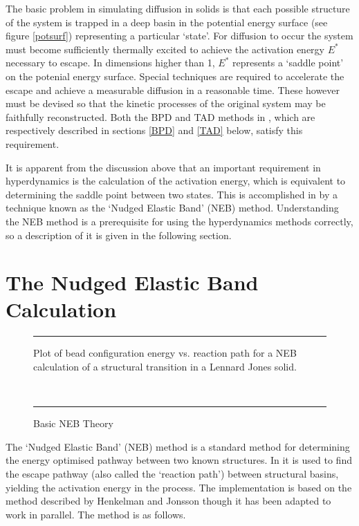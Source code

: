 The basic problem in simulating diffusion in solids is that each
possible structure of the system is trapped in a deep basin in
the potential energy surface (see figure \ref{potsurf}) representing a
particular `state'. For diffusion to occur the system must become
sufficiently thermally excited to achieve the activation energy
$E^{*}$ necessary to escape.  In dimensions higher than 1, $E^{*}$
represents a `saddle point' on the potenial energy surface.  Special
techniques are required to accelerate the escape and achieve a
measurable diffusion in a reasonable time. These however must be
devised so that the kinetic processes of the original system may be
faithfully reconstructed. Both the BPD and TAD methods in \D{}, which
are respectively described in sections \ref{BPD} and \ref{TAD} below,
satisfy this requirement.

It is apparent from the discussion above that an important requirement
in hyperdynamics is the calculation of the activation energy, which is
equivalent to determining the saddle point between two states. This is
accomplished in \D{} by a technique known as the `Nudged Elastic Band'
(NEB) method. Understanding the NEB method is a prerequisite for using
the \D{} hyperdynamics methods correctly, so a description of it is
given in the following section.

\section{The Nudged Elastic Band Calculation}

\label{NEB}
\begin{figure}[ht]
\hrule
\vspace{1.0cm}
\begin{center}
\centerline{}
\end{center}
\caption{Basic NEB Theory\label{nebfig}}
Plot of bead configuration energy vs. reaction path for a NEB
calculation of a structural transition in a Lennard Jones solid.

~
\hrule
\end{figure}
The `Nudged Elastic Band' (NEB) method is a standard method for
determining the energy optimised pathway between two known
structures. In \D{} it is used to find the escape pathway (also called
the `reaction path')  between
structural basins, yielding the activation energy in the process. The
implementation is based on the method described by Henkelman and
Jonsson\cite{henkelman-00a} though it has been adapted to work in
parallel. The method is as follows.

